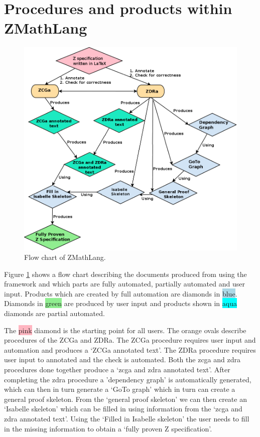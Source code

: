 \section{Procedures and products within ZMathLang}

\begin{figure}[H]
 \begin{center}
 \includegraphics [scale=0.4]{Figures/Design/ZMathLangFlow.png}
 \caption{Flow chart of ZMathLang.}
 \label{fig:zmathflow}
\end{center}
\end{figure} 

Figure \ref{fig:zmathflow} shows a flow chart describing the documents produced from using the framework and which parts are fully automated, partially automated and user input. Products which are created by full automation are diamonds in \colorbox{lightblue}{blue}. Diamonds in \colorbox{lightgreen}{green} are produced by user input and products shown in \colorbox{aqua}{aqua} diamonds are partial automated.

The \colorbox{lightpink}{pink} diamond is the starting point for all users. The \colorbox{lightorange}{orange} ovals describe procedures of the ZCGa and ZDRa. The ZCGa procedure requires user input and automation and produces a `ZCGa annotated text'. The ZDRa procedure requires user input to annotated and the check is automated. Both the \gls{zcga} and \gls{zdra} procedures done together produce a `\gls{zcga} and \gls{zdra} annotated text'. After completing the \gls{zdra} procedure a 'dependency graph' is automatically generated, which can then in turn generate a `GoTo graph' which in turn can create a general proof skeleton. From the `general proof skeleton' we can then create an `Isabelle skeleton'  which can be filled in using information from the `\gls{zcga} and \gls{zdra} annotated text'. Using the `Filled in Isabelle skeleton' the user needs to fill in the missing information to obtain a `fully proven Z specification'.

